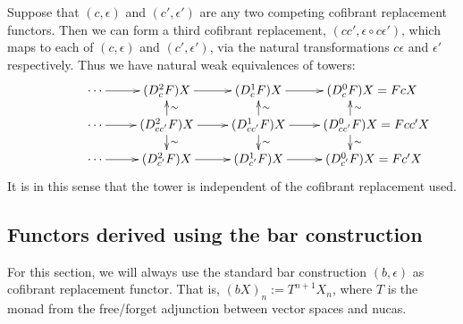 \documentclass[10pt]{article}
\newcommand{\dupdown}[2]{D^{\smash{#1}}_{\smash{#2}}}
\begin{document}
\begin{convergence}
Suppose that $(c,\epsilon)$ and $(c',\epsilon')$ are any two competing cofibrant replacement functors. Then we can form a third cofibrant replacement, $(cc',\epsilon\circ c\epsilon')$, which maps to each of $(c,\epsilon)$ and $(c',\epsilon')$, via the natural transformations $c\epsilon$ and $\epsilon'$ respectively. Thus we have natural weak equivalences of towers:
\[\xymatrix@R=4mm{
\cdots 
\ar[r]
&%
(\dupdown{2}{c}F)X
\ar[r]
&%
(\dupdown{1}{c}F)X
\ar[r]&%
(\dupdown{0}{c}F)X\makebox[0pt][l]{$\mbox{}=FcX$}\\
\cdots 
\ar[r]
&%
(\dupdown{2}{cc'}F)X
\ar[u]_-{\sim}
\ar[d]^-{\sim}
\ar[r]
&%
(\dupdown{1}{cc'}F)X
\ar[u]_-{\sim}
\ar[d]^-{\sim}
\ar[r]&%
(\dupdown{0}{cc'}F)X\makebox[0pt][l]{$\mbox{}=Fcc'X$}
\ar[u]_-{\sim}
\ar[d]^-{\sim}\\
\cdots 
\ar[r]
&%
(\dupdown{2}{c'}F)X
\ar[r]
&%
(\dupdown{1}{c'}F)X
\ar[r]&%
(\dupdown{0}{c'}F)X\makebox[0pt][l]{$\mbox{}=Fc'X$}
}\]
It is in this sense that the tower is independent of the cofibrant replacement used.




\subsection{Functors derived using the bar construction}
For this section, we will always use the standard bar construction $(b,\epsilon)$ as cofibrant replacement functor. That is, $(bX)_n:=T^{n+1}X_n$, where $T$ is the monad from the free/forget adjunction between vector spaces and nucas.


\end{convergence}
\end{document}
